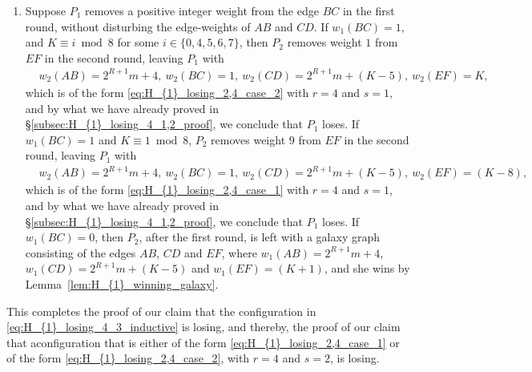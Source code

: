 \documentclass[11pt,reqno]{amsart}
\theoremstyle{definition}
\theoremstyle{definition}
\begin{document}
\begin{enumerate}
\item Suppose $P_{1}$ removes a positive integer weight from the edge $BC$ in the first round, without disturbing the edge-weights of $AB$ and $CD$. If $w_{1}(BC)=1$, and $K \equiv i \bmod 8$ for some $i \in \{0,4,5,6,7\}$, then $P_{2}$ removes weight $1$ from $EF$ in the second round, leaving $P_{1}$ with
\begin{align}
{}&w_{2}(AB)=2^{R+1}m+4,\ w_{2}(BC)=1,\ w_{2}(CD)=2^{R+1}m+(K-5),\ w_{2}(EF)=K,\nonumber
\end{align}
which is of the form \eqref{eq:H_{1}_losing_2,4_case_2} with $r=4$ and $s=1$, and by what we have already proved in \S\ref{subsec:H_{1}_losing_4_1,2_proof}, we conclude that $P_{1}$ loses. If $w_{1}(BC)=1$ and $K \equiv 1 \bmod 8$, $P_{2}$ removes weight $9$ from $EF$ in the second round, leaving $P_{1}$ with
\begin{align}
{}&w_{2}(AB)=2^{R+1}m+4,\ w_{2}(BC)=1,\ w_{2}(CD)=2^{R+1}m+(K-5),\ w_{2}(EF)=(K-8),\nonumber
\end{align}
which is of the form \eqref{eq:H_{1}_losing_2,4_case_1} with $r=4$ and $s=1$, and by what we have already proved in \S\ref{subsec:H_{1}_losing_4_1,2_proof}, we conclude that $P_{1}$ loses. If $w_{1}(BC)=0$, then $P_{2}$, after the first round, is left with a galaxy graph consisting of the edges $AB$, $CD$ and $EF$, where $w_{1}(AB)=2^{R+1}m+4$, $w_{1}(CD)=2^{R+1}m+(K-5)$ and $w_{1}(EF)=(K+1)$, and she wins by Lemma~\ref{lem:H_{1}_winning_galaxy}.
\end{enumerate}
This completes the proof of our claim that the configuration in \eqref{eq:H_{1}_losing_4_3_inductive} is losing, and thereby, the proof of our claim that aconfiguration that is either of the form \eqref{eq:H_{1}_losing_2,4_case_1} or of the form \eqref{eq:H_{1}_losing_2,4_case_2}, with $r=4$ and $s=2$, is losing. 
\end{document}
